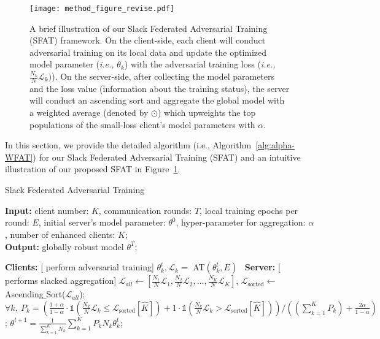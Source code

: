 \documentclass{article} %
\theoremstyle{plain}
\theoremstyle{definition}
\theoremstyle{remark}
\begin{document}
\begin{figure}[htp]
\centering
\vspace{4mm}
    \texttt{[image: method\_figure\_revise.pdf]}
    \caption{A brief illustration of our Slack Federated Adversarial Training (SFAT) framework. On the client-side, each client will conduct adversarial training on its local data and update the optimized model parameter (\textit{i.e.,} $\theta_{k}$) with the adversarial training loss (\textit{i.e.,} $\frac{N_k}{N}\mathcal{L}_k)$). On the server-side, after collecting the model parameters and the loss value (information about the training status), the server will conduct an ascending sort and aggregate the global model with a weighted average (denoted by $\odot$) which upweights the top populations of the small-loss client's model parameters with $\alpha$. }
    \label{fig:realization_illustration_app}
    \vspace{6mm}
\end{figure}

In this section, we provide the detailed algorithm (i.e., Algorithm~\ref{alg:alpha-WFAT}) for our Slack Federated Adversarial Training (SFAT) and an intuitive illustration of our proposed SFAT in Figure~\ref{fig:realization_illustration_app}. 

\vspace{2mm}
\begin{algorithm}[ht]
  \caption{Slack Federated Adversarial Training}
  \label{alg:alpha-WFAT}
  {\bf Input:} client number: $K$, communication rounds: $T$, local training epochs per round: $E$, initial server's model parameter: $\theta^0$, hyper-parameter for aggregation: $\alpha$, number of enhanced clients: $\widehat{K}$; \\
  {\bf Output:} globally robust model $\theta^{T}$;
\begin{algorithmic}[1]
    \STATE \colorbox{shadecolor}{\textbf{Clients:} [  perform adversarial training]}
    \STATE $\theta_{k}^{t}, \mathcal{L}_{k}= $ AT$(\theta_{k}^{t}, E)$~\citep{Madry_adversarial_training}
  \ENDFOR
  \STATE \colorbox{shadecolor}{\textbf{Server:} [ performs slacked aggregation]}
    \STATE $\mathcal{L}_{all}\gets[\frac{N_1}{N}\mathcal{L}_1,\frac{N_2}{N}\mathcal{L}_2,\dots,\frac{N_K}{N}\mathcal{L}_K]$,  \quad $\mathcal{L}_{\text{sorted}} \gets $ Ascending$\_$Sort($\mathcal{L}_{all}$);
  \STATE $\forall k,~P_k=(\frac{1+\alpha}{1-\alpha} \cdot \mathds{1}(\frac{N_k}{N}\mathcal{L}_k \leq \mathcal{L}_{\text{sorted}}[\widehat{K}]) + 1 \cdot \mathds{1}(\frac{N_k}{N}\mathcal{L}_k > \mathcal{L}_{\text{sorted}}[\widehat{K}]))/((\sum_{k=1}^K P_k)+\frac{2\alpha}{1-\alpha})$;
  \STATE $\theta^{t+1}=\frac{1}{\sum^{K}_{k=1} N_k}\sum^{K}_{k=1}{P_{k} N_k\theta^t_{k}}$; %
 \ENDFOR
\end{algorithmic}
\end{algorithm}
\vspace{3mm}
\end{document}
